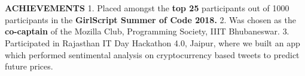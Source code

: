 \documentclass[a4paper, 12pt]{article}
\begin{document}
\vspace{-4.3cm}

\section*{}
\begin{vwcol}[widths={0.2, 0.8}, justify=flush, sep=0.7cm, rule=0pt, indent=1em]
\normalsize{\textbf{\textcolor{uclagold}{ACHIEVEMENTS}}}\newline\newline\newline\newline\newline\newline\newline\newline\newline\newline\newline\newline\newline
\large{1. Placed amongst the \textbf{top 25} participants out of 1000 participants in the \textbf{GirlScript Summer of Code 2018.}}\vspace{0.4cm}\newline
\large{2. Was chosen as the \textbf{co-captain} of the Mozilla Club, Programming Society, IIIT Bhubaneswar.}\vspace{0.4cm}\newline
\large{3. Participated in Rajasthan IT Day Hackathon 4.0, Jaipur, where we built an app which performed sentimental analysis on cryptocurrency based tweets to predict future prices.}\newline
\normalsize
\end{vwcol}
\end{document}
